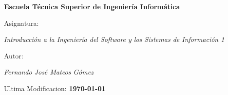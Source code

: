 \begin{titlepage}
        \centering
        {\bfseries\LARGE Escuela Técnica Superior de Ingeniería Informática \par}
        \vspace{1cm}
        {\Large Asignatura: \par \textit{Introducción a la Ingeniería del Software y los Sistemas de Información 1} \par}
        \vspace{1cm}
        {\Large Autor: \par \textit{Fernando José Mateos Gómez} \par}
        \vspace{2cm}
        {\Large Ultima Modificacion: \textbf{\today} \par}
        \vspace{2cm}
\end{titlepage}
\restoregeometry